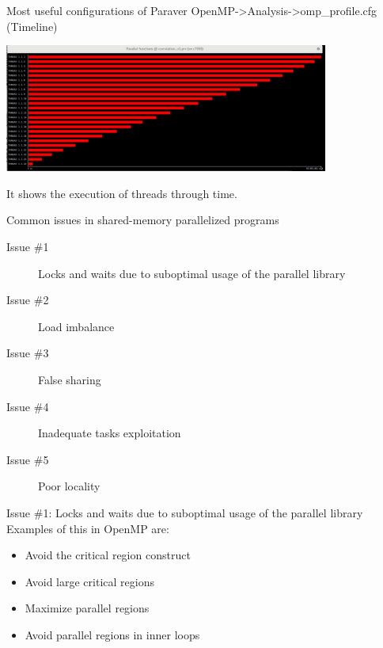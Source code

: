 \documentclass[10pt,xcolor=table]{beamer}
\begin{document}
\begin{frame}{Most useful configurations of Paraver}
\centering
OpenMP->Analysis->omp\_profile.cfg (Timeline)

\includegraphics[width=0.8\textwidth]{figs/omp_profile_timeline.png}

It shows the execution of threads through time. 
\end{frame}

\begin{frame}{Common issues in shared-memory parallelized programs}
\begin{description}
\item[Issue \#1] Locks and waits due to suboptimal usage of the parallel library
\item[Issue \#2] Load imbalance
\item[Issue \#3] False sharing
\item[Issue \#4] Inadequate tasks exploitation
\item[Issue \#5] Poor locality
\end{description}
\end{frame}

\begin{frame}{Issue \#1: Locks and waits due to suboptimal usage of the parallel library}
Examples of this in OpenMP are:
\begin{itemize}
    \item Avoid the critical region construct
    \item Avoid large critical regions
    \item Maximize parallel regions
    \item Avoid parallel regions in inner loops
\end{itemize}
\end{frame}
\end{document}
